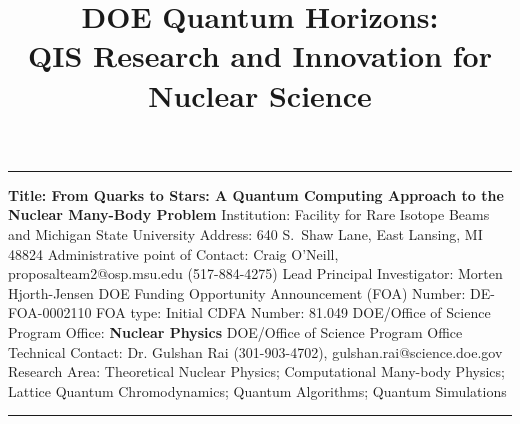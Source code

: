 \documentclass[10pt]{article}
\begin{document}
\title{DOE Quantum Horizons: \\ QIS Research and Innovation for Nuclear Science}
\maketitle
\begin{flushleft}
\rule{\linewidth}{1mm}
{\bf Title: From Quarks to Stars: A Quantum Computing Approach to the Nuclear Many-Body Problem}\newline
Institution: Facility for Rare Isotope Beams and Michigan State University\newline
Address: 640 S.~Shaw Lane, East Lansing, MI 48824\newline
Administrative point of Contact: Craig O'Neill, proposalteam2@osp.msu.edu (517-884-4275) \newline
Lead Principal Investigator: Morten Hjorth-Jensen\newline
DOE Funding Opportunity Announcement (FOA) Number: DE-FOA-0002110\newline
FOA type: Initial\newline
CDFA Number: 81.049\newline
DOE/Office of Science Program Office: {\bf Nuclear Physics}\newline
DOE/Office of Science Program Office Technical Contact: Dr. Gulshan Rai (301-903-4702), gulshan.rai@science.doe.gov\newline
Research Area: Theoretical Nuclear Physics; Computational Many-body Physics; Lattice Quantum Chromodynamics; Quantum Algorithms; Quantum Simulations
\end{flushleft}
\rule{\linewidth}{1mm}
\end{document}
